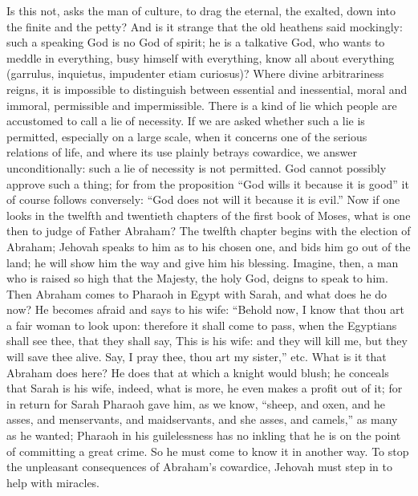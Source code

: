 \documentclass[12pt]{book}
\newcommand{\opage}[1]{\marginnote{\footnotesize\textit{[#1]}}}
\begin{document}
Is this not, asks the man of culture, to drag the eternal, the exalted,
down into the finite and the petty? And is it strange that the old
heathens said mockingly: such a speaking God is no God of spirit; he is a
talkative God, who wants to meddle in everything, busy himself with
everything, know all about everything (garrulus, inquietus, impudenter
etiam curiosus)? Where divine arbitrariness reigns, it is impossible to
distinguish between essential and inessential, moral and immoral,
permissible and impermissible. There is a kind of lie which people are
accustomed to call a lie of necessity. If we are asked whether
\opage{181}\setcounter{footnote}{0}%
such a lie is permitted, especially on a large scale, when it concerns one
of the serious relations of life, and where its use plainly betrays
cowardice, we answer unconditionally: such a lie of necessity is not
permitted. God cannot possibly approve such a thing; for from the
proposition ``God wills it because it is good'' it of course follows
conversely: ``God does not will it because it is evil.'' Now if one looks
in the twelfth and twentieth chapters of the first book of Moses, what is
one then to judge of Father Abraham? The twelfth chapter begins with the
election of Abraham; Jehovah speaks to him as to his chosen one, and bids
him go out of the land; he will show him the way and give him his
blessing. Imagine, then, a man who is raised so high that the Majesty, the
holy God, deigns to speak to him. Then Abraham comes to Pharaoh in Egypt
with Sarah, and what does he do now? He becomes afraid and says to his
wife: ``Behold now, I know that thou art a fair woman to look upon:
therefore it shall come to pass, when the Egyptians shall see thee, that
they shall say, This is his wife: and they will kill me, but they will
save thee alive. Say, I pray thee, thou art my sister,'' etc. What is it
that Abraham does here? He does that at which a knight would blush; he
conceals that Sarah is his wife, indeed, what is more, he even makes a
profit out of it; for in return for Sarah Pharaoh gave him, as we know,
``sheep, and oxen, and he asses, and menservants, and maidservants, and she
asses, and camels,'' as many as he wanted; Pharaoh in his guilelessness
has no inkling that he is on the point of committing a great crime. So he
must come to know it in another way. To stop the unpleasant consequences
of Abraham's cowardice, Jehovah must step in to help with miracles.
\end{document}
